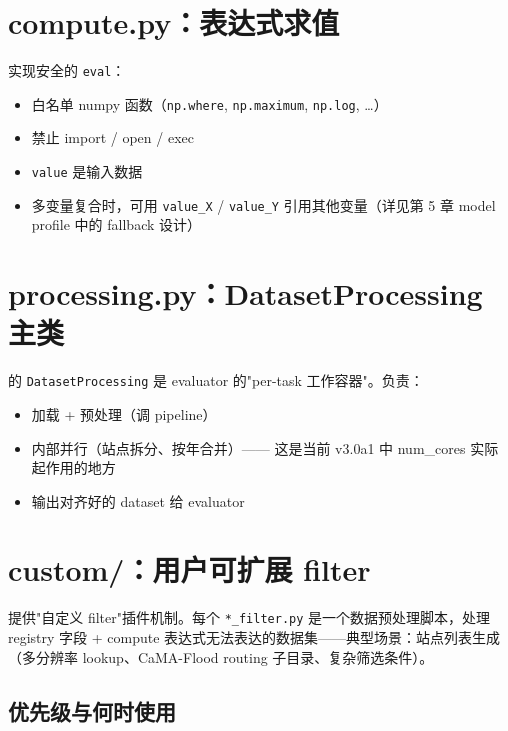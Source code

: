 \section{compute.py：表达式求值}

 实现安全的 \texttt{eval}：

\begin{itemize}
  \item 白名单 numpy 函数（\texttt{np.where}, \texttt{np.maximum}, \texttt{np.log}, \ldots）
  \item 禁止 import / open / exec
  \item \texttt{value} 是输入数据
  \item 多变量复合时，可用 \texttt{value\_X} / \texttt{value\_Y} 引用其他变量（详见第 5 章 model profile 中的 fallback 设计）
\end{itemize}

\section{processing.py：DatasetProcessing 主类}

 的 \texttt{DatasetProcessing} 是 evaluator 的"per-task 工作容器"。负责：

\begin{itemize}
  \item 加载 + 预处理（调 pipeline）
  \item 内部并行（站点拆分、按年合并）—— 这是当前 v3.0a1 中 num\_cores 实际起作用的地方
  \item 输出对齐好的 dataset 给 evaluator
\end{itemize}


\section{custom/：用户可扩展 filter}

 提供"自定义 filter"插件机制。每个 \texttt{*\_filter.py} 是一个数据预处理脚本，处理 registry 字段 + compute 表达式无法表达的数据集——典型场景：站点列表生成（多分辨率 lookup、CaMA-Flood routing 子目录、复杂筛选条件）。

\subsection{优先级与何时使用}

